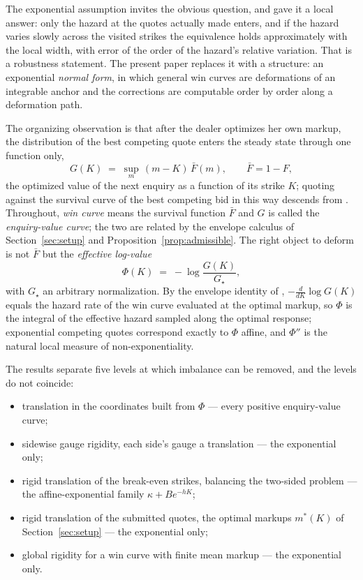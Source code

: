 \documentclass[11pt]{article}
\newcommand{\Fbar}{\bar F}
\begin{document}
The exponential assumption invites the obvious question, and \citet{cotton2026skew} gave it a local answer: only the hazard at the quotes actually made enters, and if the hazard varies slowly across the visited strikes the equivalence holds approximately with the local width, with error of the order of the hazard's relative variation. That is a robustness statement. The present paper replaces it with a structure: an exponential \emph{normal form}, in which general win curves are deformations of an integrable anchor and the corrections are computable order by order along a deformation path.

The organizing observation is that after the dealer optimizes her own markup, the distribution of the best competing quote enters the steady state through one function only,
\[
G(K) \;=\; \sup_m\,(m-K)\,\Fbar(m), \qquad \Fbar = 1 - F,
\]
the optimized value of the next enquiry as a function of its strike $K$; quoting against the survival curve of the best competing bid in this way descends from \citet{friedman1956}. Throughout, \emph{win curve} means the survival function $\Fbar$ and $G$ is called the \emph{enquiry-value curve}; the two are related by the envelope calculus of Section~\ref{sec:setup} and Proposition~\ref{prop:admissible}. The right object to deform is not $\Fbar$ but the \emph{effective log-value}
\[
\Phi(K) \;=\; -\log\frac{G(K)}{G_\star},
\]
with $G_\star$ an arbitrary normalization. By the envelope identity of \citet{cotton2026skew}, $-\tfrac{d}{dK}\log G(K)$ equals the hazard rate of the win curve evaluated at the optimal markup, so $\Phi$ is the integral of the effective hazard sampled along the optimal response; exponential competing quotes correspond exactly to $\Phi$ affine, and $\Phi''$ is the natural local measure of non-exponentiality.

The results separate five levels at which imbalance can be removed, and the levels do not coincide:
\begin{itemize}
\item translation in the coordinates built from $\Phi$ --- every positive enquiry-value curve;
\item sidewise gauge rigidity, each side's gauge a translation --- the exponential only;
\item rigid translation of the break-even strikes, balancing the two-sided problem --- the affine-exponential family $\kappa + Be^{-hK}$;
\item rigid translation of the submitted quotes, the optimal markups $m^\ast(K)$ of Section~\ref{sec:setup} --- the exponential only;
\item global rigidity for a win curve with finite mean markup --- the exponential only.
\end{itemize}
\end{document}
